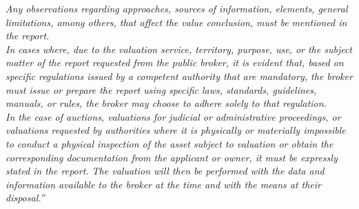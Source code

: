 \textit{Any observations regarding approaches, sources of information, elements, general limitations, among others, that affect the value conclusion, must be mentioned in the report.}\\

\textit{In cases where, due to the valuation service, territory, purpose, use, or the subject matter of the report requested from the public broker, it is evident that, based on specific regulations issued by a competent authority that are mandatory, the broker must issue or prepare the report using specific laws, standards, guidelines, manuals, or rules, the broker may choose to adhere solely to that regulation.}\\

\textit{In the case of auctions, valuations for judicial or administrative proceedings, or valuations requested by authorities where it is physically or materially impossible to conduct a physical inspection of the asset subject to valuation or obtain the corresponding documentation from the applicant or owner, it must be expressly stated in the report. The valuation will then be performed with the data and information available to the broker at the time and with the means at their disposal.''}\\



